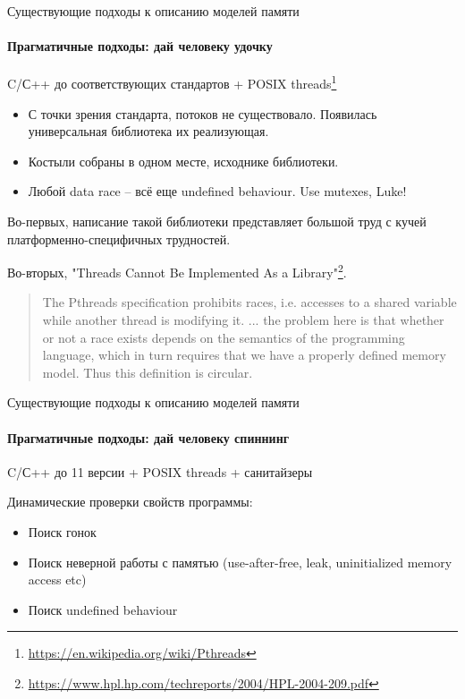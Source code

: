 \begin{frame}[t]{Существующие подходы к описанию моделей памяти}
\framesubtitle{Прагматичные подходы: дай человеку удочку}

C/С++ до соответствующих стандартов + POSIX threads\footnote{\tiny\url{https://en.wikipedia.org/wiki/Pthreads}}
%
\pause
\begin{itemize}
	\item С точки зрения стандарта, потоков не существовало. Появилась универсальная библиотека их реализующая.
	\item Костыли собраны в одном месте, исходнике библиотеки.
	\item Любой data race -- всё еще undefined behaviour. Use mutexes, Luke!
\end{itemize}

\pause
Во-первых, написание такой библиотеки представляет большой труд с кучей платформенно-специфичных трудностей.

\pause

Во-вторых, "Threads Cannot Be Implemented As a Library"\footnote<4->{\tiny\url{https://www.hpl.hp.com/techreports/2004/HPL-2004-209.pdf}}.
\pause

\begin{quote}
 The Pthreads specification prohibits races, i.e. accesses to a shared variable while another thread is modifying it. ... the
 problem here is that whether or not a race exists depends on the semantics of the programming language, which in turn requires that we have a properly defined memory model.
 Thus this definition is circular.
\end{quote}
%
\end{frame}

\begin{frame}[t]{Существующие подходы к описанию моделей памяти}
\framesubtitle{Прагматичные подходы: дай человеку спиннинг}

C/С++ до 11 версии + POSIX threads + санитайзеры

\pause

Динамические проверки свойств программы:
\begin{itemize}
	\item Поиск гонок
	\item Поиск неверной работы с памятью (use-after-free, leak, uninitialized memory access etc)
	\item Поиск undefined behaviour
\end{itemize}

\end{frame}

